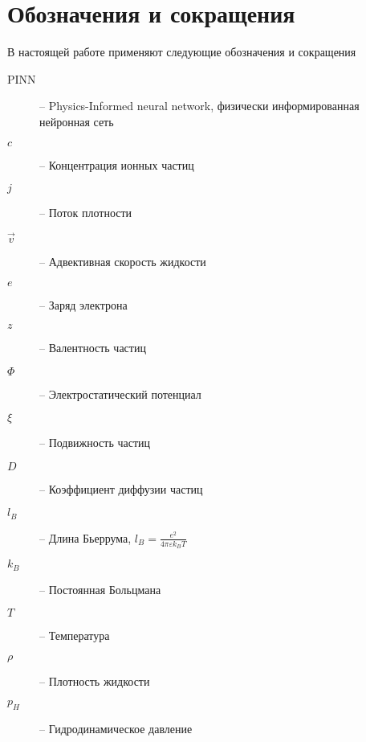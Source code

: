 \section*{Обозначения и сокращения}

В настоящей работе применяют следующие обозначения и сокращения

\begin{description}
    \item[PINN] -- Physics-Informed neural network, физически информированная нейронная сеть
    \item[$c$] -- Концентрация ионных частиц
    \item[$j$] -- Поток плотности
    \item[$\vec{v}$] -- Адвективная скорость жидкости
    \item[$e$] -- Заряд электрона
    \item[$z$] -- Валентность частиц
    \item[$\Phi$] -- Электростатический потенциал
    \item[$\xi$] -- Подвижность частиц
    \item[$D$] -- Коэффициент диффузии частиц
    \item[$l_B$] -- Длина Бьеррума, $l_B = \frac{e^2}{4\pi\varepsilon k_B T}$
    \item[$k_B$] -- Постоянная Больцмана
    \item[$T$] -- Температура
    \item[$\rho$] -- Плотность жидкости
    \item[$p_H$] -- Гидродинамическое давление
\end{description}


\newpage


